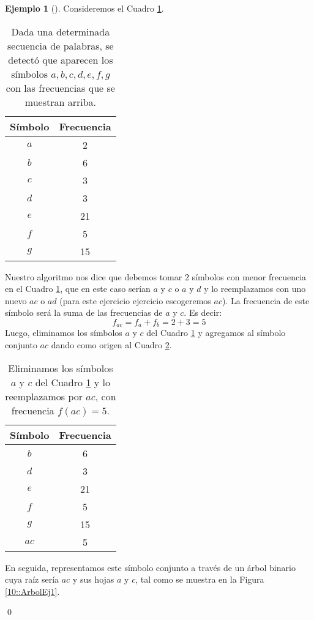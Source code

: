 \documentclass[english, spanish, fleqn, 10pt]{article}
\numberwithin{equation}{section}
\newcommand{\nparentesis}[1]{\left( #1 \right)}
\theoremstyle{definition}
\newtheorem{beforeExample}{Ejemplo}[section]
\newenvironment{ejemplo}[1][]{\begin{beforeExample}[#1]\renewcommand{\qedsymbol}{$\blacksquare$}}{\qed\end{beforeExample}}
\begin{document}
\begin{ejemplo}
	Consideremos el Cuadro \ref{10::TablaFrecuenciasEj1}.
	\begin{table}[!h]
		\centering
		\begin{tabular}{c|c}
			Símbolo & Frecuencia\\
			\hline
			$a$&2\\
			$b$&6\\
			$c$&3\\
			$d$&3\\
			$e$&21\\
			$f$&5\\
			$g$&15
		\end{tabular}
		\caption{Dada una determinada secuencia de palabras, se detectó que aparecen los símbolos $a, b, c, d, e, f, g$ con las frecuencias que se muestran arriba.}
		\label{10::TablaFrecuenciasEj1}
	\end{table}
	Nuestro algoritmo nos dice que debemos tomar 2 símbolos con menor frecuencia en el Cuadro \ref{10::TablaFrecuenciasEj1}, que en este caso serían $a$ y $c$ o $a$ y $d$ y lo reemplazamos con uno nuevo $ac$ o $ad$ (para este ejercicio ejercicio escogeremos $ac$). La frecuencia de este símbolo será la suma de las frecuencias de $a$ y $c$. Es decir:
	\begin{equation*}
	f_{ac}=f_a+f_b=2+3=5
	\end{equation*}
	Luego, eliminamos los símbolos $a$ y $c$ del Cuadro \ref{10::TablaFrecuenciasEj1} y agregamos al símbolo conjunto $ac$ dando como origen al Cuadro \ref{10::TablaFrecuenciasEj2}.
	\begin{table}[!h]
		\centering
		\begin{tabular}{c|c}
			Símbolo & Frecuencia\\
			\hline
			$b$&6\\
			$d$&3\\
			$e$&21\\
			$f$&5\\
			$g$&15\\
			$ac$&5
		\end{tabular}
		\caption{Eliminamos los símbolos $a$ y $c$ del Cuadro \ref{10::TablaFrecuenciasEj1} y lo reemplazamos por $ac$, con frecuencia $f\nparentesis{ac}=5$.}
		\label{10::TablaFrecuenciasEj2}
	\end{table}
	En seguida, representamos este símbolo conjunto a través de un árbol binario cuya raíz sería $ac$ y sus hojas $a$ y $c$, tal como se muestra en la Figura \ref{10::ArbolEj1}.
	\begin{figure}[!h]
		\centering
\end{figure}
\end{ejemplo}
\end{document}
